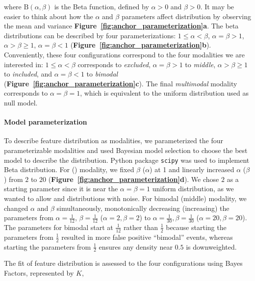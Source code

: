 where $\mathrm{B}\left(\alpha, \beta\right)$ is the Beta function, defined by $\alpha > 0$ and $\beta > 0$. It may be easier to think about how the $\alpha$ and $\beta$ parameters affect distribution by observing the mean and variance \textbf{Figure~\ref{fig:anchor_parameterization}a}. The beta distributions can be described by four parameterizations: $1 \leq \alpha < \beta$, $\alpha = \beta > 1$, $\alpha > \beta \geq 1$, $\alpha = \beta < 1$ (\textbf{Figure~\ref{fig:anchor_parameterization}b}). Conveniently, these four configurations correspond to the four modalities we are interested in: $1 \leq \alpha < \beta$ corresponds to \emph{excluded}, $\alpha = \beta > 1$ to \emph{middle}, $\alpha > \beta \geq 1$ to \emph{included}, and $\alpha = \beta < 1$ to \emph{bimodal} (\textbf{Figure~\ref{fig:anchor_parameterization}c}). The final \emph{multimodal} modality corresponds to $\alpha = \beta = 1$, which is equivalent to the uniform distribution used as null model.



\paragraph{Model parameterization}
To describe feature distribution as modalities, we parameterized the four parameterizable modalities and used Bayesian model selection to choose the best model to describe the distribution. Python package \texttt{scipy}\cite{Oliphant:2007dm,Millman:2011jv} was used to implement Beta distribution.
For \1 (\0) modality, we fixed $\beta$ ($\alpha$) at 1 and linearly increased $\alpha$ ($\beta$) from $2$ to $20$ (\textbf{Figure~\ref{fig:anchor_parameterization}d}). We chose $2$ as a starting parameter since it is near the $\alpha=\beta=1$ uniform distribution, as we wanted to allow \0 and \1 distributions with noise. For bimodal (middle) modality, we changed $\alpha$ and $\beta$ simultaneously, monotonically decreasing (increasing) the parameters from $\alpha=\frac{1}{12}$, $\beta = \frac{1}{12}$ ($\alpha = 2, \beta = 2$) to $\alpha = \frac{1}{30}, \beta = \frac{1}{30}$ ($\alpha = 20, \beta=20$). The parameters for bimodal start at $\frac{1}{12}$ rather than $\frac{1}{2}$ because starting the parameters from $\frac{1}{2}$ resulted in more false positive ``bimodal'' events, whereas starting the parameters from $\frac{1}{2}$ ensures any density near $0.5$ is downweighted.


The fit of feature distribution is assessed to the four configurations using Bayes Factors, represented by $K$,

